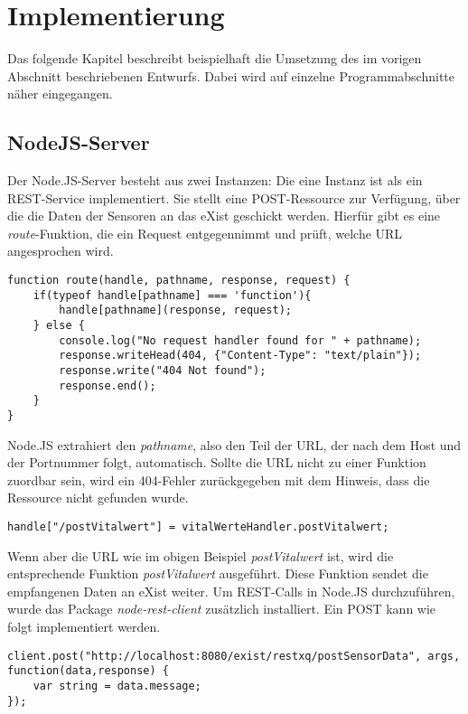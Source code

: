 \section{Implementierung}
Das folgende Kapitel beschreibt beispielhaft die Umsetzung des im vorigen Abschnitt beschriebenen Entwurfs. Dabei wird auf einzelne Programmabschnitte näher eingegangen.

\subsection{NodeJS-Server}
Der Node.JS-Server besteht aus zwei Instanzen: Die eine Instanz ist als ein REST-Service implementiert. Sie stellt eine POST-Ressource zur Verfügung, über die die Daten der Sensoren an das eXist geschickt werden. Hierfür gibt es eine \textit{route}-Funktion, die ein Request entgegennimmt und prüft, welche URL angesprochen wird. 

\begin{lstlisting}
function route(handle, pathname, response, request) {
    if(typeof handle[pathname] === 'function'){
        handle[pathname](response, request);
    } else {
        console.log("No request handler found for " + pathname);
        response.writeHead(404, {"Content-Type": "text/plain"});
        response.write("404 Not found");
        response.end();
    }
}
\end{lstlisting}

Node.JS extrahiert den \textit{pathname}, also den Teil der URL, der nach dem Host und der Portnummer folgt, automatisch. Sollte die URL nicht zu einer Funktion zuordbar sein, wird ein 404-Fehler zurückgegeben mit dem Hinweis, dass die Ressource nicht gefunden wurde.

\begin{lstlisting}
handle["/postVitalwert"] = vitalWerteHandler.postVitalwert;
\end{lstlisting}

Wenn aber die URL wie im obigen Beispiel \textit{postVitalwert} ist, wird die entsprechende Funktion \textit{postVitalwert} ausgeführt. Diese Funktion sendet die empfangenen Daten an eXist weiter. Um REST-Calls in Node.JS durchzuführen, wurde das Package \textit{node-rest-client} zusätzlich installiert. Ein POST kann wie folgt implementiert werden.

\begin{lstlisting}
client.post("http://localhost:8080/exist/restxq/postSensorData", args, function(data,response) {
    var string = data.message;
});
\end{lstlisting}

